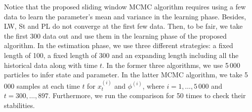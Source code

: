 Notice that the proposed sliding window MCMC algorithm requires using a few data to learn the parameter's mean and variance in the learning phase. Besides, LW, St and PL do not converge at the first few data. Then, to be fair, we take the first 300 data out and use them in the learning phase of the proposed algorithm. In the estimation phase, we use three different strategies: a fixed length of 100, a fixed length of 300 and an expanding length including all the historical data along with time $t$. In the former three algorithms, we use 5\,000 particles to infer state and parameter. In the latter MCMC algorithm, we take 5\,000 samples at each time $t$ for  $x_t^{(i)}$ and $\phi^{(i)}$, where $i=1,\ldots,5\,000$ and $t=300,\ldots,897$. Furthermore, we run the comparison for 50 times to check their stabilities. 



